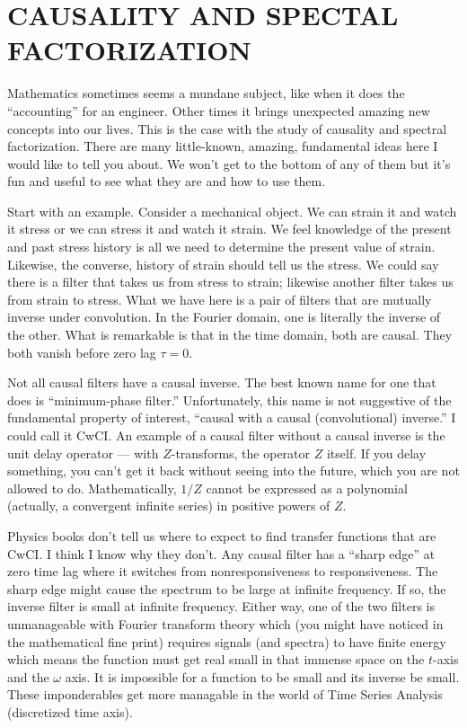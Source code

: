 \section{CAUSALITY AND SPECTAL FACTORIZATION}

Mathematics sometimes seems a mundane subject,
like when it does the ``accounting'' for an engineer.
Other times it brings unexpected amazing new concepts into our lives.
This is the case with the study of causality and spectral factorization.
There are many little-known, amazing, fundamental ideas here
I would like to tell you about.
We won't get to the bottom of any of them
but it's fun and useful to see what they are and how to use them.

\par
Start with an example.  Consider a mechanical object.
We can strain it and watch it stress or we can stress it and watch it strain.
We feel knowledge of the present and past stress history is all we need
to determine the present value of strain.
Likewise, the converse, history of strain should tell us the stress.
We could say there is a filter that takes us from stress to strain;
likewise another filter takes us from strain to stress.
What we have here is a pair of filters that are mutually inverse
under convolution.
In the Fourier domain, one is literally the inverse of the other.
What is remarkable is that in the time domain, both are causal.
They both vanish before zero lag $\tau=0$.

\par
Not all causal filters have a causal inverse.
The best known name for one that does is ``minimum-phase filter.''
Unfortunately, this name is not suggestive of
the fundamental property of interest,
``causal with a causal (convolutional) inverse.''
I could call it CwCI.
An example of a causal filter without a causal inverse is the unit
delay operator --- with $Z$-transforms, the operator $Z$ itself.
If you delay something, you can't get it back without seeing into the future,
which you are not allowed to do.
Mathematically, $1/Z$ cannot be expressed as a polynomial
(actually, a convergent infinite series) in positive powers of $Z$.

\par
Physics books don't tell us where to expect to find
transfer functions that are CwCI.
I think I know why they don't.
Any causal filter has a ``sharp edge'' at zero time lag where it switches
from nonresponsiveness to responsiveness.
The sharp edge might cause the spectrum to be large at infinite frequency.
If so, the inverse filter is small at infinite frequency.
Either way,
one of the two filters is unmanageable with Fourier transform theory
which
(you might have noticed in the mathematical fine print)
requires signals (and spectra) to have finite energy
which means the function must get real small in that immense space
on the $t$-axis and the $\omega$ axis.
It is impossible for a function to be small and its inverse be small.
These imponderables get more managable in the world of Time Series Analysis
(discretized time axis).

